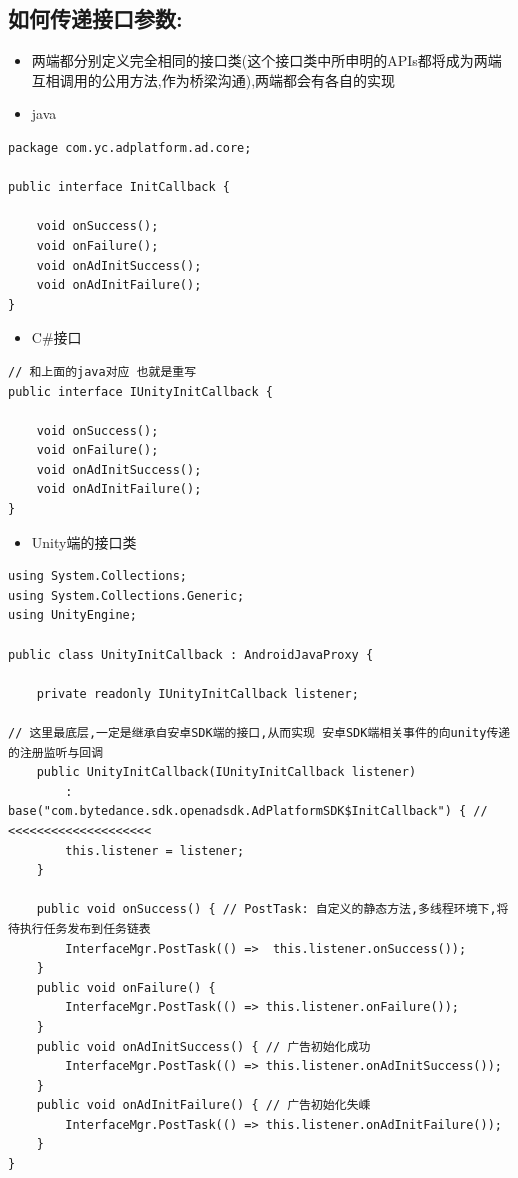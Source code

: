 \documentclass[9pt, b5paper]{article}
\begin{document}
\subsection{如何传递接口参数:}
\label{sec-1-2}
\begin{itemize}
\item 两端都分别定义完全相同的接口类(这个接口类中所申明的APIs都将成为两端互相调用的公用方法,作为桥梁沟通),两端都会有各自的实现
\item java
\end{itemize}
\begin{verbatim}
package com.yc.adplatform.ad.core;

public interface InitCallback {

    void onSuccess();  
    void onFailure();
    void onAdInitSuccess(); 
    void onAdInitFailure(); 
}
\end{verbatim}
\begin{itemize}
\item C\#接口
\end{itemize}
\begin{verbatim}
// 和上面的java对应 也就是重写
public interface IUnityInitCallback {

    void onSuccess(); 
    void onFailure();
    void onAdInitSuccess(); 
    void onAdInitFailure(); 
}
\end{verbatim}
\begin{itemize}
\item Unity端的接口类
\end{itemize}
\begin{verbatim}
using System.Collections;
using System.Collections.Generic;
using UnityEngine;

public class UnityInitCallback : AndroidJavaProxy {

    private readonly IUnityInitCallback listener;

// 这里最底层,一定是继承自安卓SDK端的接口,从而实现 安卓SDK端相关事件的向unity传递的注册监听与回调
    public UnityInitCallback(IUnityInitCallback listener)
        : base("com.bytedance.sdk.openadsdk.AdPlatformSDK$InitCallback") { // <<<<<<<<<<<<<<<<<<<< 
        this.listener = listener;
    }
    
    public void onSuccess() { // PostTask: 自定义的静态方法,多线程环境下,将待执行任务发布到任务链表
        InterfaceMgr.PostTask(() =>  this.listener.onSuccess());
    }
    public void onFailure() {
        InterfaceMgr.PostTask(() => this.listener.onFailure());
    }
    public void onAdInitSuccess() { // 广告初始化成功 
        InterfaceMgr.PostTask(() => this.listener.onAdInitSuccess());
    }
    public void onAdInitFailure() { // 广告初始化失嵊
        InterfaceMgr.PostTask(() => this.listener.onAdInitFailure());
    }
}
\end{verbatim}
\end{document}
